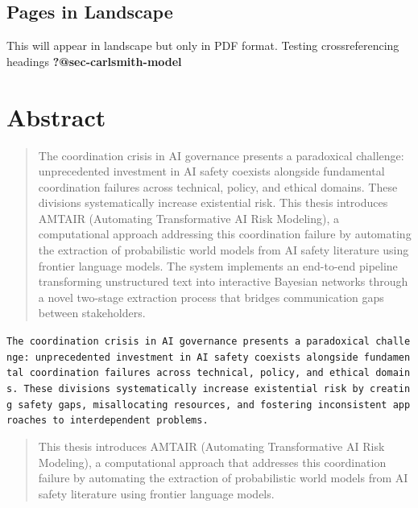 \documentclass[
  11pt,
  letterpaper,
]{book}
\begin{document}
\section*{Pages in Landscape}\label{pages-in-landscape}


\begin{landscape}

This will appear in landscape but only in PDF format. Testing
crossreferencing headings \textbf{?@sec-carlsmith-model}

\end{landscape}


\chapter*{Abstract}\label{sec-abstract}


\begin{quote}
The coordination crisis in AI governance presents a paradoxical
challenge: unprecedented investment in AI safety coexists alongside
fundamental coordination failures across technical, policy, and ethical
domains. These divisions systematically increase existential risk. This
thesis introduces AMTAIR (Automating Transformative AI Risk Modeling), a
computational approach addressing this coordination failure by
automating the extraction of probabilistic world models from AI safety
literature using frontier language models. The system implements an
end-to-end pipeline transforming unstructured text into interactive
Bayesian networks through a novel two-stage extraction process that
bridges communication gaps between stakeholders.
\end{quote}

\texttt{The\ coordination\ crisis\ in\ AI\ governance\ presents\ a\ paradoxical\ challenge:\ unprecedented\ investment\ in\ AI\ safety\ coexists\ alongside\ fundamental\ coordination\ failures\ across\ technical,\ policy,\ and\ ethical\ domains.\ These\ divisions\ systematically\ increase\ existential\ risk\ by\ creating\ safety\ gaps,\ misallocating\ resources,\ and\ fostering\ inconsistent\ approaches\ to\ interdependent\ problems.}

\begin{quote}
This thesis introduces AMTAIR (Automating Transformative AI Risk
Modeling), a computational approach that addresses this coordination
failure by automating the extraction of probabilistic world models from
AI safety literature using frontier language models.
\end{quote}
\end{document}
